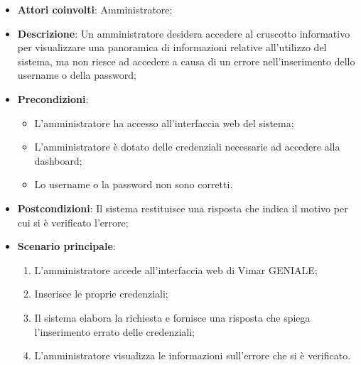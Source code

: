 \begin{itemize}
    \item \textbf{Attori coinvolti}: Amministratore;
    \item \textbf{Descrizione}: Un amministratore desidera accedere al cruscotto informativo per visualizzare una panoramica di informazioni relative all’utilizzo del sistema, ma non riesce ad accedere a causa di un errore nell’inserimento dello username o della password;
    \item \textbf{Precondizioni}: 
        \begin{itemize}
            \item L’amministratore ha accesso all’interfaccia web del sistema;
            \item L’amministratore è dotato delle credenziali necessarie ad accedere alla dashboard;
            \item Lo username o la password non sono corretti.
        \end{itemize}
    \item \textbf{Postcondizioni}: Il sistema restituisce una risposta che indica il motivo per cui si è verificato l’errore;
    \item \textbf{Scenario principale}:
    \begin{enumerate}
    \item L’amministratore accede all’interfaccia web di Vimar GENIALE;
    \item Inserisce le proprie credenziali;
    \item Il sistema elabora la richiesta e fornisce una risposta che spiega l’inserimento errato delle credenziali;
    \item L’amministratore visualizza le informazioni sull’errore che si è verificato.
    \end{enumerate}
\end{itemize}

